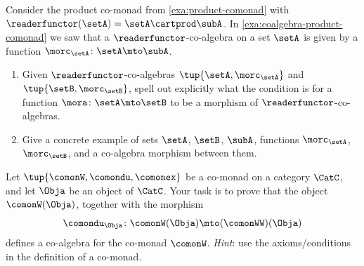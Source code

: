 \begin{gradedexercise}
    \label{ex:ProductComonadCoalgebraMorphisms}
    Consider the product co-monad from \cref{exa:product-comonad} with $\readerfunctor(\setA) = \setA \cartprod \subA$.
    In \cref{exa:coalgebra-product-comonad} we saw that a $\readerfunctor$-co-algebra on a set $\setA$ is given by a function $\morc_\setA \colon \setA \mto \subA$.
    \begin{enumerate}
        \item Given $\readerfunctor$-co-algebras $\tup{\setA, \morc_\setA}$ and $\tup{\setB, \morc_\setB}$, spell out explicitly what the condition is for a function $\mora \colon \setA \mto \setB$ to be a morphism of $\readerfunctor$-co-algebras.
        \item Give a concrete example of sets $\setA$, $\setB$, $\subA$, functions $\morc_\setA$, $\morc_\setB$, and a co-algebra morphism between them.
    \end{enumerate}
\end{gradedexercise}

\begin{gradedexercise}
    \label{ex:CofreeCoalgebras}
    Let $\tup{\comonW, \comondu, \comonex}$ be a co-monad on a category $\CatC$, and let $\Obja$ be an object of $\CatC$.
    Your task is to prove that the object $\comonW(\Obja)$, together with the morphism
    \begin{equation}
        \comondu_\Obja \colon \comonW(\Obja) \mto (\comonWW)(\Obja)
    \end{equation}
    defines a co-algebra for the co-monad $\comonW$.
    \emph{Hint}: use the axioms/conditions in the definition of a co-monad.
\end{gradedexercise}
